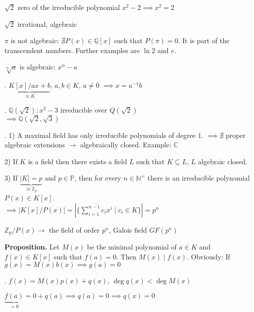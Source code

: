 $\sqrt{2}$ zero of the irreducible polynomial $x^2 -2 \implies x^2 = 2$

$\sqrt{2}$ irrational, algebraic

$\pi$ is not algebraic: $\nexists P(x) \in \mathbb{Q}[x]$ such that $P(\pi) = 0$. It is part of the transcendent numbers. Further examples are $\ln 2$ and $e$.

$\sqrt[n]{a}$ is algebraic: $x^n-a$

\Example.
$\underbrace{K[x]/ax+b}_{\cong K}$, $a,b \in K$, $ a\neq 0$ $\implies x = a^{-1}b$

\Example.
$\mathbb{Q}(\sqrt{2}): x^2 -3$ irreducible over $Q(\sqrt{2})$\\
$\implies \mathbb{Q}(\sqrt{2}, \sqrt{3})$

\Remark.
1) A maximal field has only irreducible polynomials of degree $1$. $\implies \nexists$ proper algebraic extensions $\rightarrow$ algebraically closed. Example: $\mathbb{C}$

2) If $K$ is a field then there exists a field $L$ such that $K \subseteq L$, $L$ algebraic closed.

3) If $\underbrace{|K| = p}_{\cong \mathbb{Z}_p}$ and $p\in \mathbb{P}$, then for every $n \in \mathbb{N}^{+}$ there is an irreducible polynomial $P(x) \in K[x]$. \\
$\implies \left| K[x]/P(x) \right| = \left| \{\overline{\sum_{i=1}^{n-1} c_i x^i} \mid c_i \in K\} \right| = p^n$

$\mathbb{Z}_p/P(x) \rightarrow$ the field of order $p^n$, Galois field $GF(p^n)$

\textbf{Proposition.}
Let $M(x)$ be the minimal polynomial of $a \in K$ and $f(x) \in K[x]$ such that $f(a) = 0$. Then $M(x)∣f(x)$. Obviously: If $g(x) = M(x)b(x) \implies g(a) = 0$

\Proof.
$f(x) = M(x) p(x) + q(x)$, $\deg q(x) < \deg M(x)$

$\underbrace{f(a)}_{=0} = 0 + q(a) \implies q(a) = 0 \implies q(x) = 0$

